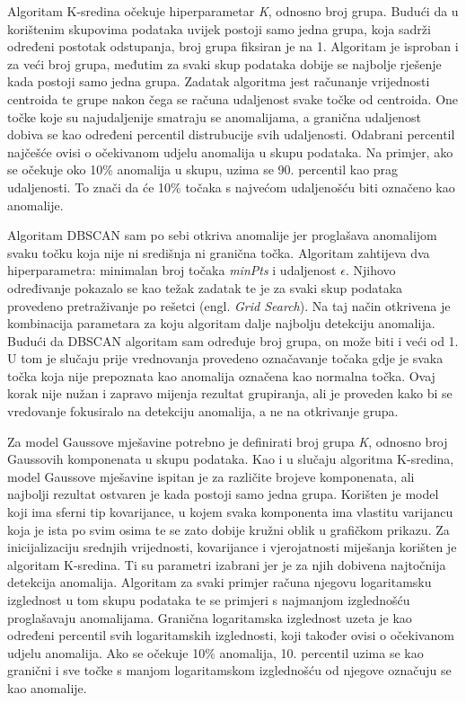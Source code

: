 \documentclass[utf8, diplomski, numeric]{fer}
\begin{document}
Algoritam K-sredina očekuje hiperparametar \textit{K}, odnosno broj grupa. Budući da u korištenim skupovima podataka uvijek postoji samo jedna grupa, koja sadrži određeni postotak odstupanja, broj grupa fiksiran je na 1. Algoritam je isproban i za veći broj grupa, međutim za svaki skup podataka dobije se najbolje rješenje kada postoji samo jedna grupa. Zadatak algoritma jest računanje vrijednosti centroida te grupe nakon čega se računa udaljenost svake točke od centroida. One točke koje su najudaljenije smatraju se anomalijama, a granična udaljenost dobiva se kao određeni percentil distrubucije svih udaljenosti. Odabrani percentil najčešće ovisi o očekivanom udjelu anomalija u skupu podataka. Na primjer, ako se očekuje oko 10\% anomalija u skupu, uzima se 90. percentil kao prag udaljenosti. To znači da će 10\% točaka s najvećom udaljenošću biti označeno kao anomalije.

Algoritam DBSCAN sam po sebi otkriva anomalije jer proglašava anomalijom svaku točku koja nije ni središnja ni granična točka. Algoritam zahtijeva dva hiperparametra: minimalan broj točaka \textit{minPts} i udaljenost $\epsilon$. Njihovo određivanje pokazalo se kao težak zadatak te je za svaki skup podataka provedeno pretraživanje po rešetci (engl. \textit{Grid Search}). Na taj način otkrivena je kombinacija parametara za koju algoritam dalje najbolju detekciju anomalija. Budući da DBSCAN algoritam sam određuje broj grupa, on može biti i veći od 1. U tom je slučaju prije vrednovanja provedeno označavanje točaka gdje je svaka točka koja nije prepoznata kao anomalija označena kao normalna točka. Ovaj korak nije nužan i zapravo mijenja rezultat grupiranja, ali je proveden kako bi se vredovanje fokusiralo na detekciju anomalija, a ne na otkrivanje grupa.

Za model Gaussove mješavine potrebno je definirati broj grupa \textit{K}, odnosno broj Gaussovih komponenata u skupu podataka. Kao i u slučaju algoritma K-sredina, model Gaussove mješavine ispitan je za različite brojeve komponenata, ali najbolji rezultat ostvaren je kada postoji samo jedna grupa. Korišten je model koji ima sferni tip kovarijance, u kojem svaka komponenta ima vlastitu varijancu koja je ista po svim osima te se zato dobije kružni oblik u grafičkom prikazu. Za inicijalizaciju srednjih vrijednosti, kovarijance i vjerojatnosti miješanja korišten je algoritam K-sredina. Ti su parametri izabrani jer je za njih dobivena najtočnija detekcija anomalija. Algoritam za svaki primjer računa njegovu logaritamsku izglednost u tom skupu podataka te se primjeri s najmanjom izglednošću proglašavaju anomalijama. Granična logaritamska izglednost uzeta je kao određeni percentil svih logaritamskih izglednosti, koji također ovisi o očekivanom udjelu anomalija. Ako se očekuje 10\% anomalija, 10. percentil uzima se kao granični i sve točke s manjom logaritamskom izglednošću od njegove označuju se kao anomalije.
\end{document}
